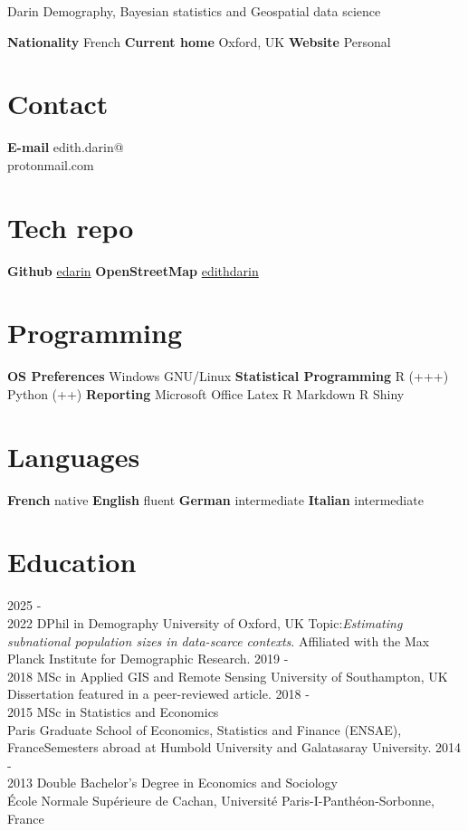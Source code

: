 \documentclass[
]{friggeri-cv}
\author{}
\date{\vspace{-2.5em}}
\begin{document}
 { Darin}
{\qquad \qquad  \qquad  \qquad Demography, Bayesian statistics and Geospatial data science}


\begin{aside}
\textbf{Nationality}
French
\textbf{Current home}
Oxford, UK
\textbf{Website}
Personal \href{https://edarin.github.io/thatsme/}{\scriptsize{}}
~
\section{Contact}
\textbf{E-mail}
edith.darin@\\protonmail.com
~
\section{Tech repo}
\textbf{Github}
\href{https://github.com/edarin}{edarin}
\textbf{OpenStreetMap}
\href{https://www.openstreetmap.org/user/edithdarin/history#map=5/22.938/11.470}{edithdarin}
~
\section{Programming}
\textbf{OS Preferences}
Windows
GNU/Linux
\textbf{Statistical Programming}
R (+++)
Python (++)
\textbf{Reporting}
Microsoft Office
Latex
R Markdown
R Shiny
~
\section{Languages}
\textbf{French} native
\textbf{English} fluent
\textbf{German} intermediate
\textbf{Italian} intermediate
~
\end{aside}
\section{Education}
\begin{entrylist}
\entry
{2025 - \\ 2022}
{DPhil in Demography}
{University of Oxford, UK}
{Topic:\textit{Estimating subnational population sizes in data-scarce contexts}. Affiliated with the Max Planck Institute for Demographic Research.}
\entry
{2019 - \\ 2018}
{MSc in Applied GIS and Remote Sensing}
{University of Southampton, UK}
{Dissertation featured in a peer-reviewed article.}
\entry
{2018 - \\ 2015}
{MSc in Statistics and Economics}
{\\Paris Graduate School of Economics, Statistics and Finance (ENSAE), France}{Semesters abroad at Humbold University and Galatasaray University.}
\entry
{2014 - \\ 2013}
{Double Bachelor's Degree in Economics and Sociology}
{\\École Normale Supérieure de Cachan, Université Paris-I-Panthéon-Sorbonne, France}
{}
\end{entrylist}
\end{document}
